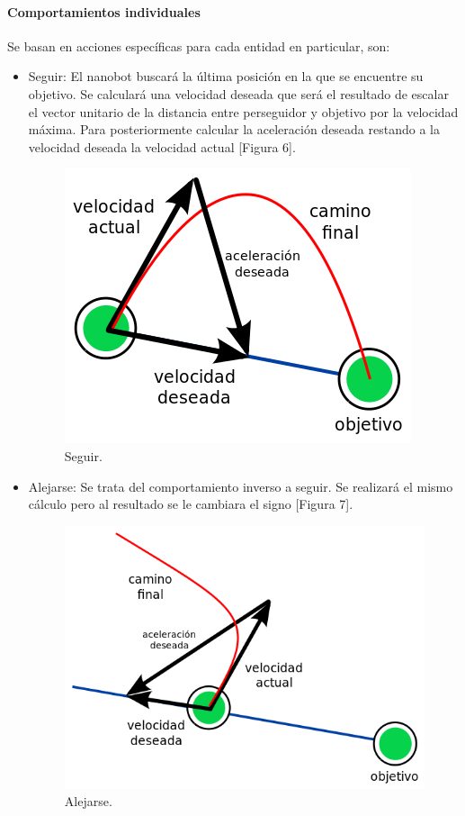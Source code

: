 \paragraph{Comportamientos individuales}
Se basan en acciones específicas para cada entidad en particular, son:  
\begin{itemize}
 \item Seguir: El nanobot buscará la última posición en la que se encuentre su objetivo. Se calculará una velocidad deseada que será el resultado de escalar el vector unitario de la distancia entre perseguidor y objetivo por la velocidad máxima. Para posteriormente calcular la aceleración deseada restando a la velocidad deseada la velocidad actual [Figura 6]. 
 
 \begin{figure}[H]
 \centering
 \includegraphics[scale=0.4]{../images/seek.png}
 \caption{Seguir.}
 \label{fig:../images/seek.png}
 \end{figure}

\item Alejarse: Se trata del comportamiento inverso a seguir. Se realizará el mismo cálculo pero al resultado se le cambiara el signo [Figura 7]. 

 \begin{figure}[H]
 \centering
 \includegraphics[scale=0.4]{../images/flee.png}
 \caption{Alejarse.}
 \label{fig:../images/flee.png}
 \end{figure}


\end{itemize}
